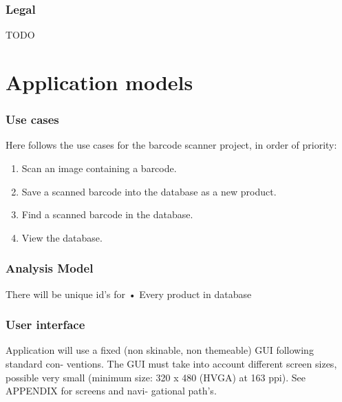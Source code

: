 \documentclass{report}
\begin{document}
\subsection{Legal}
TODO

\pagebreak

\chapter{Application models}

\subsection{Use cases}
Here follows the use cases for the barcode scanner project, in order of priority: 

\begin{enumerate}
  \item Scan an image containing a barcode.
  \item Save a scanned barcode into the database as a new product.
  \item Find a scanned barcode in the database.
  \item View the database.
\end{enumerate}

\subsection{Analysis Model}

There will be unique id's for
• Every product in database

\subsection{User interface}
Application will use a fixed (non skinable, non themeable) GUI following standard con- ventions. The GUI must take into account different screen sizes, possible very small (minimum size: 320 x 480 (HVGA) at 163 ppi). See APPENDIX for screens and navi- gational path's.





\appendix
\end{document}
